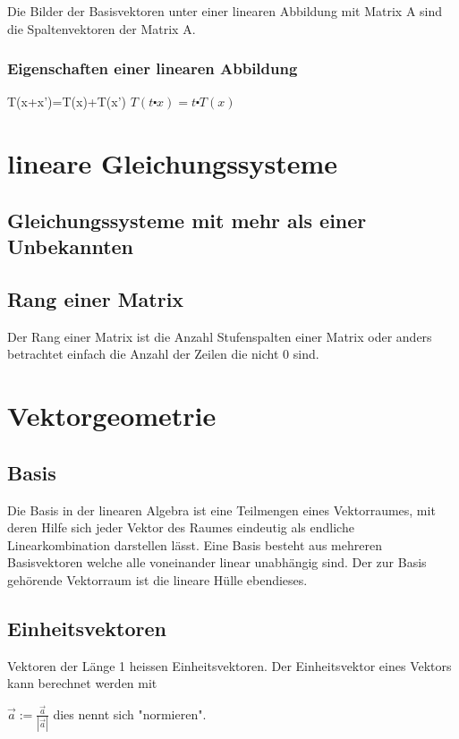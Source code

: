 \documentclass[11pt,a4paper,onecolumn]{scrartcl}
\begin{document}
\begin{flushleft}
Die Bilder der Basisvektoren unter einer linearen Abbildung mit Matrix A
sind die Spaltenvektoren der Matrix A.
\subsubsection{Eigenschaften einer linearen Abbildung}
T(x+x')=T(x)+T(x')\linebreak
$T(t\centerdot x) = t \centerdot T(x)$\linebreak



\section{lineare Gleichungssysteme}
\subsection{Gleichungssysteme mit mehr als einer Unbekannten}
\subsection{Rang einer Matrix}
Der Rang einer Matrix ist die Anzahl Stufenspalten einer Matrix oder anders betrachtet einfach die Anzahl der Zeilen die nicht 0 sind.


\section{Vektorgeometrie}

\subsection{Basis}
Die Basis in der linearen Algebra ist eine Teilmengen eines Vektorraumes, mit deren Hilfe sich jeder Vektor des Raumes eindeutig als endliche Linearkombination darstellen lässt. Eine Basis besteht aus mehreren Basisvektoren welche alle voneinander linear unabhängig sind.
Der zur Basis gehörende Vektorraum ist die lineare Hülle ebendieses.

\subsection{Einheitsvektoren}
Vektoren der Länge 1 heissen Einheitsvektoren.\linebreak
Der Einheitsvektor eines Vektors kann berechnet werden mit \linebreak

$\vec{a} := \frac{\vec{a}}{|\vec{a}|}$ dies nennt sich "normieren".


\end{flushleft}
\end{document}
